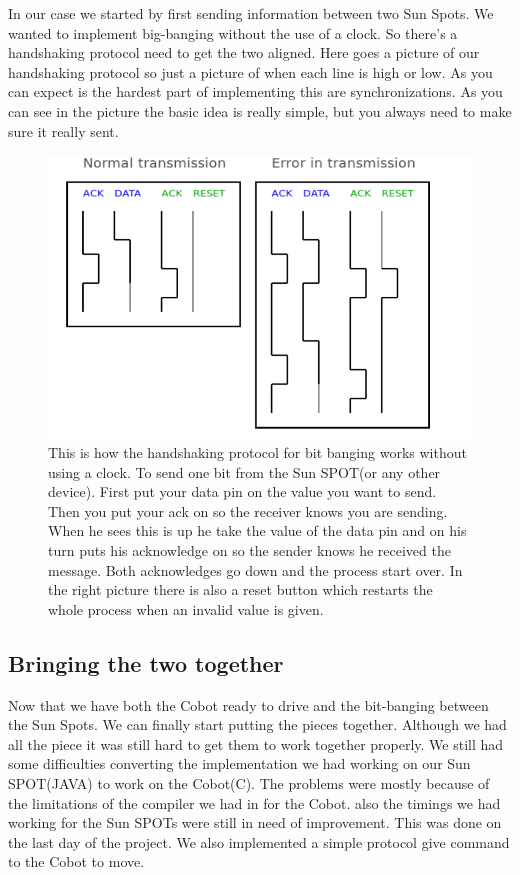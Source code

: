 \documentclass[a4,english]{article}
\begin{document}
In our case we started by first sending information between two Sun Spots. We wanted to implement big-banging without the use of a clock. So there's a handshaking protocol need to get the two aligned. Here goes a picture of our handshaking protocol so just a picture of when each line is high or low.
As you can expect is the hardest part of implementing this are synchronizations. As you can see in the picture the basic idea is really simple, but you always need to make sure it really sent. 
\begin{figure}
\label{fig:handshaking}
\includegraphics[scale = 0.5]{handshaking.png}
\caption{This is how the handshaking protocol for bit banging works without using a clock. To send one bit from the Sun SPOT(or any other device). First put your data pin on the value you want to send. Then you put your ack on so the receiver knows you are sending. When he sees this is up he take the value of the data pin and on his turn puts his acknowledge on so the sender knows he received the message. Both acknowledges go down and the process start over. In the right picture there is also a reset button which restarts the whole process when an invalid value is given. }
\end{figure}

\subsection{Bringing the two together}
\label{subsec:together}
Now that we have both the Cobot ready to drive and the bit-banging between the Sun Spots. We can finally start putting the pieces together. Although we had all the piece it was still hard to get them to work together properly. We still had some difficulties converting the implementation we had working on our Sun SPOT(JAVA) to work on the Cobot(C). The problems were mostly because of the limitations of the compiler we had in for the Cobot. also the timings we had working for the Sun SPOTs were still in need of improvement. This was done on the last day of the project. We also implemented a simple protocol give command to the Cobot to move. 
\end{document}
